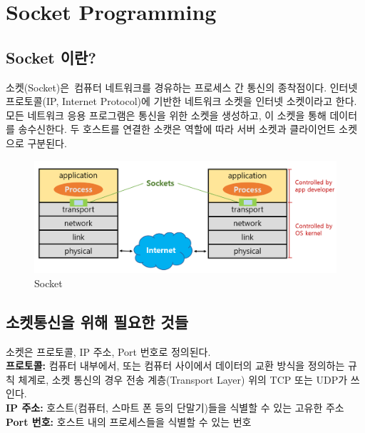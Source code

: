 \section{Socket Programming}
\subsection{Socket 이란?}
    소켓(Socket)은 컴퓨터 네트워크를 경유하는 프로세스 간 통신의 종착점이다. 인터넷 프로토콜(IP, Internet Protocol)에 기반한 네트워크 소켓을 인터넷 소켓이라고 한다. 모든 네트워크 응용 프로그램은 통신을 위한 소켓을 생성하고, 이 소켓을 통해 데이터를 송수신한다. 두 호스트를 연결한 소캣은 역할에 따라 서버 소켓과 클라이언트 소켓으로 구분된다. \\
    \vspace{-4mm}
    \begin{figure}[!h]\centering
		\includegraphics[width=.65\textwidth]{image/week07/1-1.png}
		\caption{\small Socket}
		\vspace{-10pt}
    \end{figure}
    
\subsection{소켓통신을 위해 필요한 것들}    
    소켓은 프로토콜, IP 주소, Port 번호로 정의된다. \\
    
    \textbf{프로토콜:} 컴퓨터 내부에서, 또는 컴퓨터 사이에서 데이터의 교환 방식을 정의하는 규칙 체계로, 소켓 통신의 경우 전송 계층(Transport Layer) 위의 TCP 또는 UDP가 쓰인다. \\
    \textbf{IP 주소:} 호스트(컴퓨터, 스마트 폰 등의 단말기)들을 식별할 수 있는 고유한 주소 \\
    \textbf{Port 번호:} 호스트 내의 프로세스들을 식별할 수 있는 번호 \\
    
